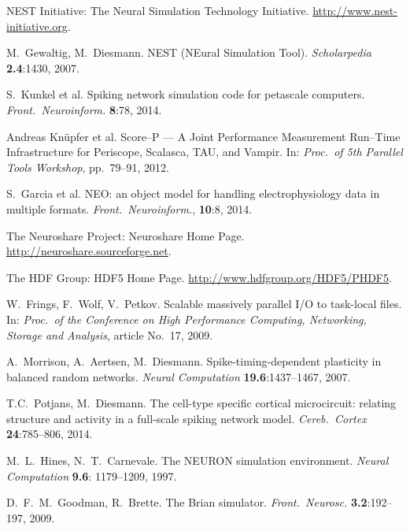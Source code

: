 \documentclass[]{YIC2015}
\begin{document}
\begin{thebibliography}{99}

 NEST Initiative: The Neural Simulation
  Technology Initiative. \url{http://www.nest-initiative.org}.

  M.~Gewaltig, M.~Diesmann. NEST (NEural Simulation
  Tool). \textit{Scholarpedia} %
  \textbf{2.4}:1430, 2007.

 S.~Kunkel et al. Spiking network simulation code for
  petascale computers.  \textit{Front.~Neuroinform.} \textbf{8}:78,
  2014.

 Andreas Kn\"upfer et al. Score--P --- A Joint
  Performance Measurement Run--Time Infrastructure for Periscope,
  Scalasca, TAU, and Vampir. In: \textit{Proc.~of 5th Parallel Tools
    Workshop}, pp.~79--91, 2012.

 S.~Garcia et al. NEO: an object model for handling
  electrophysiology data in multiple formats.
  \textit{Front.~Neuroinform.}, \textbf{10}:8, 2014.

 The Neuroshare Project: Neuroshare Home
  Page. \url{http://neuroshare.sourceforge.net}.

 The HDF Group: HDF5 Home
  Page. \url{http://www.hdfgroup.org/HDF5/PHDF5}.

 W.~Frings, F.~Wolf, V.~Petkov. Scalable
  massively parallel I/O to task-local files.  In: \textit{Proc.~of
  the Conference on High Performance Computing, Networking,
    Storage and Analysis}, article No.~17, 2009.

 A.~Morrison, A.~Aertsen,
  M.~Diesmann. Spike-timing-dependent plasticity in balanced random
  networks. \textit{Neural Computation} \textbf{19.6}:1437--1467,
  2007.

 T.C.~Potjans, M.~Diesmann. The cell-type specific
  cortical microcircuit: relating structure and activity in a
  full-scale spiking network model. \textit{Cereb.~Cortex}
  \textbf{24}:785--806, 2014.

 M.~L.~Hines, N.~T.~Carnevale. The NEURON simulation
  environment. \textit{Neural Computation} \textbf{9.6}: 1179--1209,
  1997.

 D.~F.~M.~Goodman, R.~Brette. The Brian
  simulator. \textit{Front.~Neurosc.} \textbf{3.2}:192--197, 2009.

\end{thebibliography}
\end{document}
